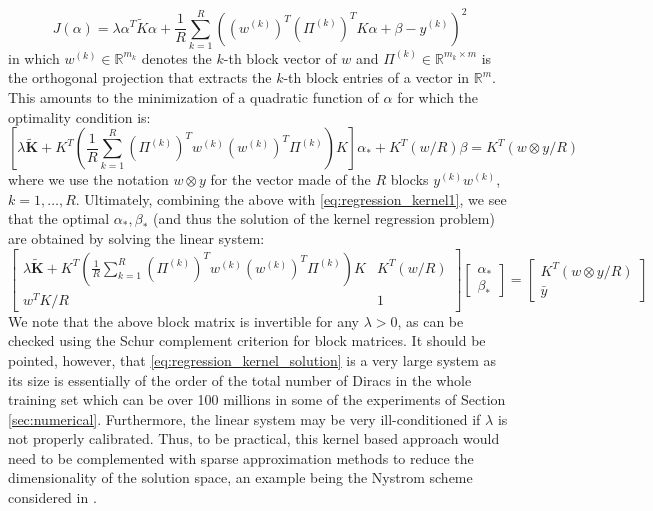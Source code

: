 \documentclass[11pt]{article}
\newcommand{\R}{\mathbb{R}}
\begin{document}
\begin{equation*}
    J(\alpha) =  \lambda \alpha^T \tilde{K} \alpha + \frac{1}{R}\sum_{k=1}^{R} \left((w^{(k)})^T (\Pi^{(k)})^T K \alpha + \beta - y^{(k)}\right)^2
\end{equation*}
in which $w^{(k)} \in \R^{m_k}$ denotes the $k$-th block vector of $w$ and $\Pi^{(k)} \in \R^{m_k \times m}$ is the orthogonal projection that extracts the $k$-th block entries of a vector in $\R^{m}$. This amounts to the minimization of a quadratic function of $\alpha$ for which the optimality condition is:
\begin{equation*}
    \left[\lambda\tilde{\mathbf{K}} + K^T\left(\frac{1}{R} \sum_{k=1}^R (\Pi^{(k)})^T w^{(k)} (w^{(k)})^T  \Pi^{(k)} \right) K \right]\alpha_* + K^T(w/R) \beta= K^T(w \otimes y/R) 
\end{equation*}
where we use the notation $w \otimes y$ for the vector made of the $R$ blocks $y^{(k)} w^{(k)}$, $k=1,\ldots,R$. Ultimately, combining the above with \eqref{eq:regression_kernel1}, we see that the optimal $\alpha_*,\beta_*$ (and thus the solution of the kernel regression problem) are obtained by solving the linear system:
\begin{equation}
\label{eq:regression_kernel_solution}
    \begin{bmatrix}
        \lambda\tilde{\mathbf{K}} + K^T\left(\frac{1}{R} \sum_{k=1}^R (\Pi^{(k)})^T w^{(k)} (w^{(k)})^T  \Pi^{(k)} \right) K  & K^T(w/R) \\
        w^T K/R & 1
    \end{bmatrix}
    \begin{bmatrix}
        \alpha_* \\
        \beta_*
    \end{bmatrix}= 
    \begin{bmatrix}
        K^T(w \otimes y/R) \\
        \bar{y}
    \end{bmatrix}
\end{equation}
We note that the above block matrix is invertible for any $\lambda >0$, as can be checked using the Schur complement criterion for block matrices. It should be pointed, however, that \eqref{eq:regression_kernel_solution} is a very large system as its size is essentially of the order of the total number of Diracs in the whole training set which can be over 100 millions in some of the experiments of Section \ref{sec:numerical}. Furthermore, the linear system may be very ill-conditioned if $\lambda$ is not properly calibrated. Thus, to be practical, this kernel based approach would need to be complemented with sparse approximation methods to reduce the dimensionality of the solution space, an example being the Nystrom scheme considered in \cite{paul2024sparse}.     
\end{document}
